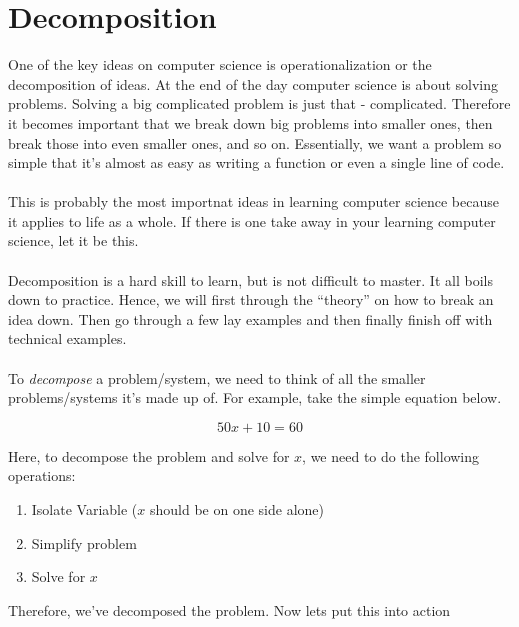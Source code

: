 \documentclass[12pt,a4paper]{book}
\begin{document}
		\section{Decomposition}
			One of the key ideas on computer science is operationalization or the decomposition of ideas. At the end of the day computer science is about solving problems. Solving a big complicated problem is just that - complicated. Therefore it becomes important that we break down big problems into smaller ones, then break those into even smaller ones, and so on. Essentially, we want a problem so simple that it's almost as easy as writing a function or even a single line of code.
			\\\\
			This is probably the most importnat ideas in learning computer science because it applies to life as a whole. If there is one take away in your learning computer science, let it be this.
			\\\\
			Decomposition is a hard skill to learn, but is not difficult to master. It all boils down to practice. Hence, we will first through the ``theory'' on how to break an idea down. Then go through a few lay examples and then finally finish off with technical examples.
			\\\\
			To \textit{decompose} a problem/system, we need to think of all the smaller problems/systems it's made up of. For example, take the simple equation below.

			\begin{equation*}
				50x + 10 = 60
			\end{equation*}

			Here, to decompose the problem and solve for $x$, we need to do the following operations:

			\begin{enumerate}
				\item Isolate Variable ($x$ should be on one side alone)
				\item Simplify problem
				\item Solve for $x$
			\end{enumerate}
			
			Therefore, we've decomposed the problem. Now lets put this into action
\end{document}

